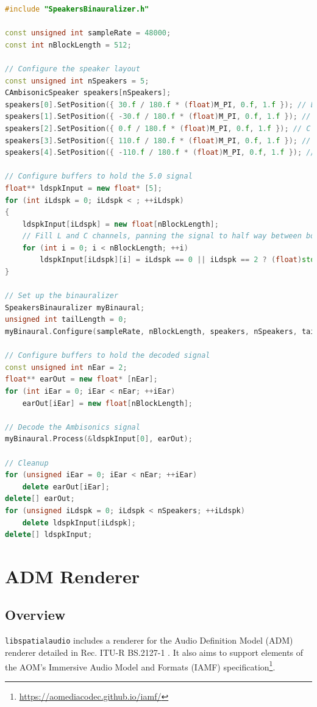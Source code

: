 \documentclass[12pt]{report}
\def\libspataud{\texttt{libspatialaudio}\xspace}
\begin{document}
\begin{lstlisting}[language=C++]
#include "SpeakersBinauralizer.h"

const unsigned int sampleRate = 48000;
const int nBlockLength = 512;

// Configure the speaker layout
const unsigned int nSpeakers = 5;
CAmbisonicSpeaker speakers[nSpeakers];
speakers[0].SetPosition({ 30.f / 180.f * (float)M_PI, 0.f, 1.f }); // L
speakers[1].SetPosition({ -30.f / 180.f * (float)M_PI, 0.f, 1.f }); // R
speakers[2].SetPosition({ 0.f / 180.f * (float)M_PI, 0.f, 1.f }); // C
speakers[3].SetPosition({ 110.f / 180.f * (float)M_PI, 0.f, 1.f }); // Ls
speakers[4].SetPosition({ -110.f / 180.f * (float)M_PI, 0.f, 1.f }); // Rs

// Configure buffers to hold the 5.0 signal
float** ldspkInput = new float* [5];
for (int iLdspk = 0; iLdspk < ; ++iLdspk)
{
    ldspkInput[iLdspk] = new float[nBlockLength];
    // Fill L and C channels, panning the signal to half way between both speakers
    for (int i = 0; i < nBlockLength; ++i)
        ldspkInput[iLdspk][i] = iLdspk == 0 || iLdspk == 2 ? (float)std::sin((float)M_PI * 2.f * 440.f * (float)i / (float)sampleRate) : 0.f;
}

// Set up the binauralizer
SpeakersBinauralizer myBinaural;
unsigned int tailLength = 0;
myBinaural.Configure(sampleRate, nBlockLength, speakers, nSpeakers, tailLength);

// Configure buffers to hold the decoded signal
const unsigned int nEar = 2;
float** earOut = new float* [nEar];
for (int iEar = 0; iEar < nEar; ++iEar)
    earOut[iEar] = new float[nBlockLength];

// Decode the Ambisonics signal
myBinaural.Process(&ldspkInput[0], earOut);

// Cleanup
for (unsigned iEar = 0; iEar < nEar; ++iEar)
    delete earOut[iEar];
delete[] earOut;
for (unsigned iLdspk = 0; iLdspk < nSpeakers; ++iLdspk)
    delete ldspkInput[iLdspk];
delete[] ldspkInput;
\end{lstlisting}


\chapter{ADM Renderer}\label{ADMRenderer}

\section{Overview}

\libspataud includes a renderer for the Audio Definition Model (ADM) renderer detailed in Rec. ITU-R BS.2127-1 \cite{ITU2127}. It also aims to support elements of the AOM's Immersive Audio Model and Formats (IAMF) specification\footnote{\href{https://aomediacodec.github.io/iamf/}{https://aomediacodec.github.io/iamf/}}.
\end{document}
